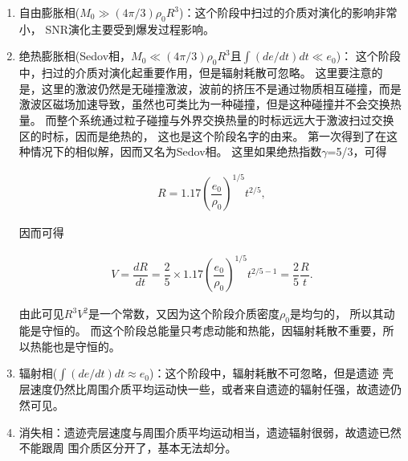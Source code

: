 \begin{enumerate}

    \item 自由膨胀相($M_0\gg(4\pi/3)\rho_0R^3$)：这个阶段中扫过的介质对演化的影响非常小，
    SNR演化主要受到爆发过程影响。

    \item 绝热膨胀相(Sedov相，$M_0\ll(4\pi/3)\rho_0R^3$且$\int (de/dt) dt\ll e_0$)：
    这个阶段中，扫过的介质对演化起重要作用，但是辐射耗散可忽略。
    这里要注意的是，这里的激波仍然是无碰撞激波，波前的挤压不是通过物质相互碰撞，而是
    激波区磁场加速导致，虽然也可类比为一种碰撞，但是这种碰撞并不会交换热量。
    而整个系统通过粒子碰撞与外界交换热量的时标远远大于激波扫过交换区的时标，因而是绝热的，
    这也是这个阶段名字的由来。
    \citet{1959sdmm.book.....S}第一次得到了在这种情况下的相似解，因而又名为Sedov相。
    这里如果绝热指数$\gamma$=5/3，可得

    \begin{equation}
      \begin{aligned}
        R = 1.17\left(\dfrac{e_0}{\rho_0}\right)^{1/5}t^{2/5},
      \end{aligned}
    \end{equation}

    因而可得

    \begin{equation}
      \begin{aligned}
        V = \dfrac{dR}{dt} = \dfrac{2}{5}\times1.17\left(\dfrac{e_0}{\rho_0}\right)^{1/5}t^{2/5-1} = \dfrac{2}{5}\dfrac{R}{t}.
      \end{aligned}
    \end{equation}

    由此可见$R^3V^2$是一个常数，又因为这个阶段介质密度$\rho_0$是均匀的，
    所以其动能是守恒的。
    而这个阶段总能量只考虑动能和热能，因辐射耗散不重要，所以热能也是守恒的。

    \item 辐射相($\int (de/dt) dt\approx  e_0$)：这个阶段中，辐射耗散不可忽略，但是遗迹
    壳层速度仍然比周围介质平均运动快一些，或者来自遗迹的辐射任强，故遗迹仍然可见。

    \item 消失相：遗迹壳层速度与周围介质平均运动相当，遗迹辐射很弱，故遗迹已然不能跟周
    围介质区分开了，基本无法却分。

\end{enumerate}

